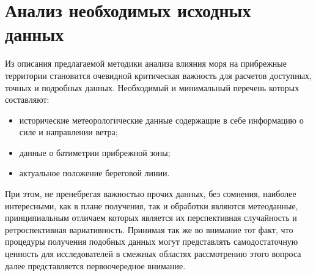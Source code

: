 
\newpage
\section{Анализ необходимых исходных данных}
\label{part:data_intro}

Из описания предлагаемой методики анализа влияния моря на прибрежные территории становится очевидной критическая важность для расчетов доступных, точных и подробных данных.
Необходимый и минимальный перечень которых составляют:

\begin{itemize}
\item исторические метеорологические данные содержащие в себе информацию о силе и направлении ветра;
\item данные о батиметрии прибрежной зоны;
\item актуальное положение береговой линии.
\end{itemize}

При этом, не пренебрегая важностью прочих данных, без сомнения, наиболее интересными, как в плане получения, так и обработки являются метеоданные, принципиальным отличаем которых является их перспективная случайность и ретроспективная вариативность.
Принимая так же во внимание тот факт, что процедуры получения подобных данных могут представлять самодостаточную ценность для исследователей в смежных областях рассмотрению этого вопроса далее представляется первоочередное внимание.

